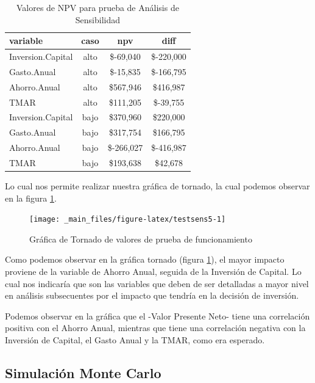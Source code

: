 \documentclass[
]{book}
\begin{document}
\begin{table}

\caption{\label{tab:testsens4}Valores de NPV para prueba de Análisis de Sensibilidad}
\centering
\begin{tabular}[t]{l|c|c|c}
\hline
variable & caso & npv & diff\\
\hline
Inversion.Capital & alto & \$-69,040 & \$-220,000\\
\hline
Gasto.Anual & alto & \$-15,835 & \$-166,795\\
\hline
Ahorro.Anual & alto & \$567,946 & \$416,987\\
\hline
TMAR & alto & \$111,205 & \$-39,755\\
\hline
Inversion.Capital & bajo & \$370,960 & \$220,000\\
\hline
Gasto.Anual & bajo & \$317,754 & \$166,795\\
\hline
Ahorro.Anual & bajo & \$-266,027 & \$-416,987\\
\hline
TMAR & bajo & \$193,638 & \$42,678\\
\hline
\end{tabular}
\end{table}

Lo cual nos permite realizar nuestra gráfica de tornado, la cual podemos
observar en la figura \ref{fig:testsens5}.

\begin{figure}

{\centering \texttt{[image: \_main\_files/figure-latex/testsens5-1]} 

}

\caption{Gráfica de Tornado de valores de prueba de funcionamiento}\label{fig:testsens5}
\end{figure}

Como podemos observar en la gráfica tornado (figura
\ref{fig:testsens5}), el mayor impacto proviene de la variable de
Ahorro Anual, seguida de la Inversión de Capital. Lo cual nos indicaría
que son las variables que deben de ser detalladas a mayor nivel en
análisis subsecuentes por el impacto que tendría en la decisión de
inversión.

Podemos observar en la gráfica que el -Valor Presente Neto- tiene una
correlación positiva con el Ahorro Anual, mientras que tiene una
correlación negativa con la Inversión de Capital, el Gasto Anual y la
TMAR, como era esperado.

\newpage

\hypertarget{simulaciuxf3n-monte-carlo-1}{%
\subsection{Simulación Monte Carlo}\label{simulaciuxf3n-monte-carlo-1}}
\end{document}
